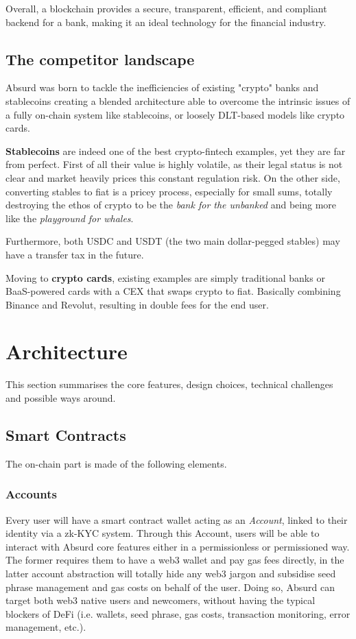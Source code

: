 \documentclass[a4paper,10 pt]{article}
\theoremstyle{definition}
\begin{document}
Overall, a blockchain provides a secure, transparent, efficient, and compliant backend for a bank, making it an ideal technology for the financial industry.

\subsection{The competitor landscape}
Absurd was born to tackle the inefficiencies of existing "crypto" banks and stablecoins creating a blended architecture able to overcome the intrinsic issues of a fully on-chain system like stablecoins, or loosely DLT-based models like crypto cards.

\textbf{Stablecoins} are indeed one of the best crypto-fintech examples, yet they are far from perfect. First of all their value is highly volatile, as their legal status is not clear and market heavily prices this constant regulation risk. On the other side, converting stables to fiat is a pricey process, especially for small sums, totally destroying the ethos of crypto to be the \textit{bank for the unbanked} and being more like the \textit{playground for whales}.

Furthermore, both USDC and USDT (the two main dollar-pegged stables) may have a transfer tax in the future.

Moving to \textbf{crypto cards}, existing examples are simply traditional banks or BaaS-powered cards with a CEX that swaps crypto to fiat. Basically combining Binance and Revolut, resulting in double fees for the end user.

\newpage

\section{Architecture}
This section summarises the core features, design choices, technical challenges and possible ways around.

\subsection{Smart Contracts}
The on-chain part is made of the following elements.

\subsubsection{Accounts}
Every user will have a smart contract wallet acting as an \textit{Account}, linked to their identity via a zk-KYC system. Through this Account, users will be able to interact with Absurd core features either in a permissionless or permissioned way. The former requires them to have a web3 wallet and pay gas fees directly, in the latter account abstraction will totally hide any web3 jargon and subsidise seed phrase management and gas costs on behalf of the user.
Doing so, Absurd can target both web3 native users and newcomers, without having the typical blockers of DeFi (i.e. wallets, seed phrase, gas costs, transaction monitoring, error management, etc.).
\end{document}
